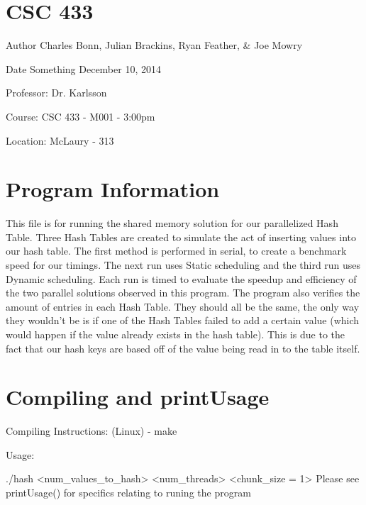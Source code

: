 \hypertarget{index_course_section}{}\section{C\-S\-C 433}\label{index_course_section}
\begin{DoxyAuthor}{Author}
Charles Bonn, Julian Brackins, Ryan Feather, \& Joe Mowry
\end{DoxyAuthor}
\begin{DoxyDate}{Date}
Something December 10, 2014
\end{DoxyDate}
\begin{DoxyParagraph}{Professor\-:}
Dr. Karlsson
\end{DoxyParagraph}
\begin{DoxyParagraph}{Course\-:}
C\-S\-C 433 -\/ M001 -\/ 3\-:00pm
\end{DoxyParagraph}
\begin{DoxyParagraph}{Location\-:}
Mc\-Laury -\/ 313
\end{DoxyParagraph}
\hypertarget{index_program_section}{}\section{Program Information}\label{index_program_section}
This file is for running the shared memory solution for our parallelized Hash Table. Three Hash Tables are created to simulate the act of inserting values into our hash table. The first method is performed in serial, to create a benchmark speed for our timings. The next run uses Static scheduling and the third run uses Dynamic scheduling. Each run is timed to evaluate the speedup and efficiency of the two parallel solutions observed in this program. The program also verifies the amount of entries in each Hash Table. They should all be the same, the only way they wouldn't be is if one of the Hash Tables failed to add a certain value (which would happen if the value already exists in the hash table). This is due to the fact that our hash keys are based off of the value being read in to the table itself.\hypertarget{index_compile_section}{}\section{Compiling and print\-Usage}\label{index_compile_section}
\begin{DoxyParagraph}{Compiling Instructions\-:}
(Linux) -\/ make
\end{DoxyParagraph}
\begin{DoxyParagraph}{Usage\-:}
\begin{DoxyVerb}./hash <num_values_to_hash> <num_threads> <chunk_size = 1>
Please see printUsage() for specifics relating to runing the program
\end{DoxyVerb}

\end{DoxyParagraph}
